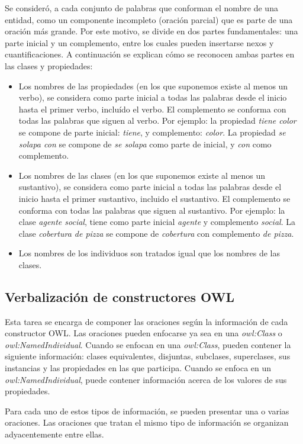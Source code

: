 Se consideró, a cada conjunto de palabras que conforman el nombre de una entidad, como un componente incompleto (oración parcial) que es parte de una oración más grande. Por este motivo, se divide en dos partes fundamentales: una parte inicial y un complemento, entre los cuales pueden insertarse nexos y cuantificaciones. A continuación se explican cómo se reconocen ambas partes en las clases y propiedades:
\begin{itemize}
    \item Los nombres de las propiedades (en los que suponemos existe al menos un verbo), se considera como parte inicial a todas las palabras desde el inicio hasta el primer verbo, incluído el verbo. El complemento se conforma con todas las palabras que siguen al verbo. Por ejemplo: la propiedad \emph{tiene color} se compone de parte inicial: \emph{tiene}, y complemento: \emph{color}. La propiedad \emph{se solapa con} se compone de \emph{se solapa} como parte de inicial, y \emph{con} como complemento.
    \item Los nombres de las clases (en los que suponemos existe al menos un sustantivo), se considera como parte inicial a todas las palabras desde el inicio hasta el primer sustantivo, incluido el sustantivo. El complemento se conforma con todas las palabras que siguen al sustantivo. Por ejemplo: la clase \emph{agente social}, tiene como parte inicial \emph{agente} y complemento \emph{social}. La clase \emph{cobertura de pizza} se compone de \emph{cobertura} con complemento \emph{de pizza}.
    \item Los nombres de los individuos son tratados igual que los nombres de las clases.
\end{itemize}


\subsection{Verbalización de constructores OWL}
\label{sec:verbalizacion_constructores}
Esta tarea se encarga de componer las oraciones según la información de cada constructor OWL. Las oraciones pueden enfocarse ya sea en una \emph{owl:Class} o  \emph{owl:NamedIndividual}. Cuando se enfocan en una \emph{owl:Class}, pueden contener la siguiente información: clases equivalentes, disjuntas, subclases, superclases, sus instancias y las propiedades en las que participa. Cuando se enfoca en un \emph{owl:NamedIndividual}, puede contener información acerca de los valores de sus propiedades.

Para cada uno de estos tipos de información, se pueden presentar una o varias oraciones. Las oraciones que tratan el mismo tipo de información se organizan adyacentemente entre ellas.
\\


